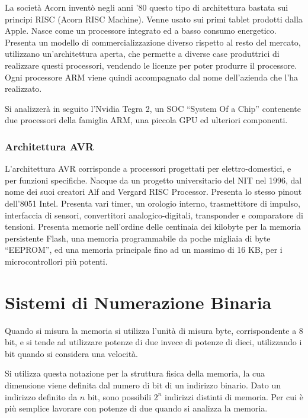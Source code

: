\documentclass{article}
\numberwithin{equation}{subsection}
\begin{document}
La società Acorn inventò negli anni '80 questo tipo di architettura bastata sui principi RISC (Acorn RISC Machine). Venne usato sui primi tablet prodotti dalla Apple. Nasce come 
un processore integrato ed a basso consumo energetico. Presenta un modello di commercializzazione diverso rispetto al resto del mercato, utilizzano un'architettura aperta, che 
permette a diverse case produttrici di realizzare questi processori, vendendo le licenze per poter produrre il processore. Ogni processore ARM viene quindi accompagnato dal nome 
dell'azienda che l'ha realizzato. 

Si analizzerà in seguito l'Nvidia Tegra 2, un SOC ``System Of a Chip'' contenente due processori della famiglia ARM, una piccola GPU ed ulteriori componenti.  

\subsubsection{Architettura AVR}
L'architettura AVR corrisponde a processori progettati per elettro-domestici, e per funzioni specifiche. Nacque da un progetto universitario del NIT nel 1996, dal nome dei 
suoi creatori Alf and Vergard RISC Processor. Presenta lo stesso pinout dell'8051 Intel. Presenta vari timer, un orologio interno, trasmettitore di impulso, interfaccia 
di sensori, convertitori analogico-digitali, transponder e comparatore di tensioni. Presenta memorie nell'ordine delle centinaia dei kilobyte per la memoria persistente Flash, 
una memoria programmabile da poche migliaia di byte ``EEPROM'', ed una memoria principale fino ad un massimo di 16 KB, per i microcontrollori più potenti. 

\clearpage

\section{Sistemi di Numerazione Binaria}


Quando si misura la memoria si utilizza l'unità di misura byte, corrispondente a 8 bit, e si tende ad utilizzare potenze di due invece di potenze di dieci, utilizzando 
i bit quando si considera una velocità. 

Si utilizza questa notazione per la struttura fisica della memoria, la cua dimensione viene definita dal numero di bit di un indirizzo binario. Dato un indirizzo definito da 
$n$ bit, sono possibili $2^n$ indirizzi distinti di memoria. Per cui è più semplice lavorare con potenze di due quando si analizza la memoria. 
\end{document}
